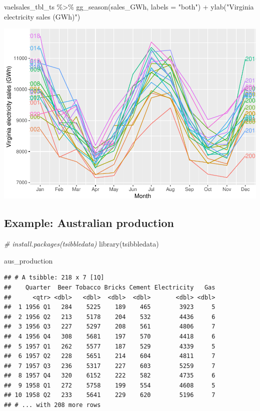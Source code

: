 \documentclass[
]{book}
\newenvironment{Shaded}{\begin{snugshade}}{\end{snugshade}}
\newcommand{\AttributeTok}[1]{\textcolor[rgb]{0.77,0.63,0.00}{#1}}
\newcommand{\CommentTok}[1]{\textcolor[rgb]{0.56,0.35,0.01}{\textit{#1}}}
\newcommand{\FunctionTok}[1]{\textcolor[rgb]{0.00,0.00,0.00}{#1}}
\newcommand{\NormalTok}[1]{#1}
\newcommand{\SpecialCharTok}[1]{\textcolor[rgb]{0.00,0.00,0.00}{#1}}
\newcommand{\StringTok}[1]{\textcolor[rgb]{0.31,0.60,0.02}{#1}}
\begin{document}
\begin{Shaded}
\begin{Highlighting}[]
\NormalTok{vaelsales\_tbl\_ts }\SpecialCharTok{\%\textgreater{}\%} \FunctionTok{gg\_season}\NormalTok{(sales\_GWh, }\AttributeTok{labels =} \StringTok{"both"}\NormalTok{) }\SpecialCharTok{+} \FunctionTok{ylab}\NormalTok{(}\StringTok{"Virginia electricity sales (GWh)"}\NormalTok{)}
\end{Highlighting}
\end{Shaded}

\includegraphics{graphics/unnamed-chunk-15-1.pdf}

\hypertarget{example-australian-production}{%
\subsection{Example: Australian production}\label{example-australian-production}}

\begin{Shaded}
\begin{Highlighting}[]
\CommentTok{\# install.packages(\textquotesingle{}tsibbledata\textquotesingle{})}
\FunctionTok{library}\NormalTok{(tsibbledata)}

\NormalTok{aus\_production}
\end{Highlighting}
\end{Shaded}

\begin{verbatim}
## # A tsibble: 218 x 7 [1Q]
##    Quarter  Beer Tobacco Bricks Cement Electricity   Gas
##      <qtr> <dbl>   <dbl>  <dbl>  <dbl>       <dbl> <dbl>
##  1 1956 Q1   284    5225    189    465        3923     5
##  2 1956 Q2   213    5178    204    532        4436     6
##  3 1956 Q3   227    5297    208    561        4806     7
##  4 1956 Q4   308    5681    197    570        4418     6
##  5 1957 Q1   262    5577    187    529        4339     5
##  6 1957 Q2   228    5651    214    604        4811     7
##  7 1957 Q3   236    5317    227    603        5259     7
##  8 1957 Q4   320    6152    222    582        4735     6
##  9 1958 Q1   272    5758    199    554        4608     5
## 10 1958 Q2   233    5641    229    620        5196     7
## # ... with 208 more rows
\end{verbatim}
\end{document}
